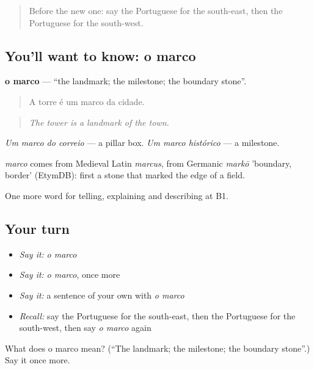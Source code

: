 \label{lesson:PT-C439-marco}



\begin{quote}
Before the new one: say the Portuguese for the south-east, then the Portuguese for the south-west.
\end{quote}

\subsection*{You'll want to know: o marco}
\textbf{o marco} — \textquotedblleft{}the landmark; the milestone; the boundary stone\textquotedblright{}.

\begin{quote}
A torre é um marco da cidade.
\end{quote}

\begin{quote}
\emph{The tower is a landmark of the town.}
\end{quote}

\emph{Um marco do correio} — a pillar box. \emph{Um marco histórico} — a milestone.

\begin{cousinweb}
\emph{marco} comes from Medieval Latin \emph{marcus}, from Germanic \emph{markō} 'boundary, border' (EtymDB): first a stone that marked the edge of a field.
\end{cousinweb}

\begin{grammarlens}[title={What you've built}]
One more word for telling, explaining and describing at B1.
\end{grammarlens}

\subsection*{Your turn}
\begin{itemize}
\raggedright
  \item \emph{Say it:} \emph{o marco}
  \item \emph{Say it:} \emph{o marco}, once more
  \item \emph{Say it:} a sentence of your own with \emph{o marco}
  \item \emph{Recall:} say the Portuguese for the south-east, then the Portuguese for the south-west, then say \emph{o marco} again
\end{itemize}

\begin{tcolorbox}[breakable,colback=teal!4,colframe=teal!35!black,title={Before you move on}]
What does o marco mean? (\textquotedblleft{}The landmark; the milestone; the boundary stone\textquotedblright{}.) Say it once more.
\end{tcolorbox}

